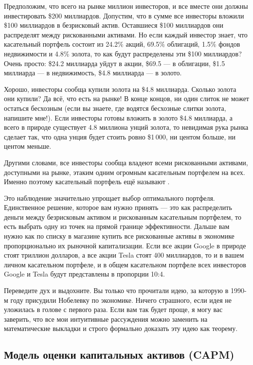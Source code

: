 Предположим, что всего на рынке миллион инвесторов, и все вместе они должны инвестировать \$200 миллиардов. Допустим, что в сумме все инвесторы вложили \$100 миллиардов в безрисковый актив. Оставшиеся \$100 миллиардов они распределят между рискованными активами. Но если каждый инвестор знает, что касательный портфель состоит из 24.2\% акций, 69.5\% облигаций, 1.5\% фондов недвижимости и 4.8\% золота, то как будут распределены эти \$100 миллиардов? Очень просто: \$24.2 миллиарда уйдут в акции, \$69.5 --- в облигации, \$1.5 миллиарда --- в недвижимость, \$4.8 миллиарда --- в золото.

Хорошо, инвесторы сообща купили золота на \$4.8 миллиарда. Сколько золота они купили? Да всё, что есть на рынке! В конце концов, ни один слиток не может остаться бесхозным (если вы знаете, где водятся бесхозные слитки золота, напишите мне!). Если инвесторы готовы вложить в золото \$4.8 миллиарда, а всего в природе существует 4.8 миллиона унций золота, то невидимая рука рынка сделает так, что одна унция будет стоить ровно \$1\,000, ни центом больше, ни центом меньше.

Другими словами, все инвесторы сообща владеют всеми рискованными активами, доступными на рынке, этаким одним огромным касательным портфелем на всех. Именно поэтому касательный портфель ещё называют .

Это наблюдение значительно упрощает выбор оптимального портфеля. Единственное решение, которое вам нужно принять --- это как распределить деньги между безрисковым активом и рискованным касательным портфелем, то есть выбрать одну из точек на прямой границе эффективности. Дальше вам нужно как по списку в магазине купить все рискованные активы в экономике пропорционально их рыночной капитализации. Если все акции Google в природе стоят триллион долларов, а все акции Tesla стоят 400 миллиардов, то и в вашем личном касательном портфеле, и в общем касательном портфеле всех инвесторов Google и Tesla будут представлены в пропорции 10:4.

Переведите дух и выдохните. Вы только что прочитали идею, за которую в 1990-м году  присудили Нобелевку по экономике. Ничего страшного, если идея не уложилась в голове с первого раза. Если вам так будет проще, я могу вас заверить, что все мои интуитивные рассуждения можно заменить на математические выкладки и строго формально доказать эту идею как теорему.

\subsection{Модель оценки капитальных активов (CAPM)}

